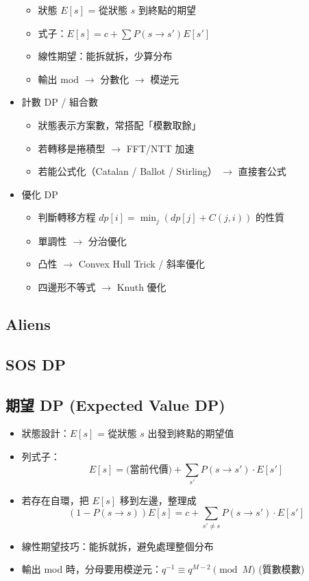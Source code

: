 \documentclass[a4paper,10pt,twocolumn,oneside]{article}
\begin{document}
\begin{itemize}[nolistsep]
        \begin{itemize}[nolistsep]
            \item 狀態 $E[s]$ = 從狀態 $s$ 到終點的期望  
            \item 式子：$E[s] = c + \sum P(s \to s') E[s']$  
            \item 線性期望：能拆就拆，少算分布  
            \item 輸出 mod $\rightarrow$ 分數化 $\rightarrow$  模逆元  
        \end{itemize}
    \item 計數 DP / 組合數  
        \begin{itemize}[nolistsep]
            \item 狀態表示方案數，常搭配「模數取餘」  
            \item 若轉移是捲積型 $\rightarrow$ FFT/NTT 加速  
            \item 若能公式化（Catalan / Ballot / Stirling） $\rightarrow$ 直接套公式  
        \end{itemize}
    \item 優化 DP  
        \begin{itemize}[nolistsep]
            \item 判斷轉移方程 $dp[i] = \min_j (dp[j] + C(j,i))$ 的性質  
            \item 單調性 $\rightarrow$ 分治優化  
            \item 凸性 $\rightarrow$ Convex Hull Trick / 斜率優化  
            \item 四邊形不等式 $\rightarrow$ Knuth 優化  
        \end{itemize}
\end{itemize}

\subsection{Aliens}


\subsection{SOS DP}


\subsection{期望 DP (Expected Value DP)}

\begin{itemize}[nolistsep]
    \item 狀態設計：$E[s]$ = 從狀態 $s$ 出發到終點的期望值
    \item 列式子：
    \[
        E[s] = \text{(當前代價)} + \sum_{s'} P(s \to s') \cdot E[s']
    \]
    \item 若存在自環，把 $E[s]$ 移到左邊，整理成
    \[
        (1 - P(s \to s)) E[s] = c + \sum_{s' \neq s} P(s \to s') \cdot E[s']
    \]
    \item 線性期望技巧：能拆就拆，避免處理整個分布
    \item 輸出 mod 時，分母要用模逆元：$q^{-1} \equiv q^{M-2} \pmod{M}$ (質數模數)
\end{itemize}
\end{document}
